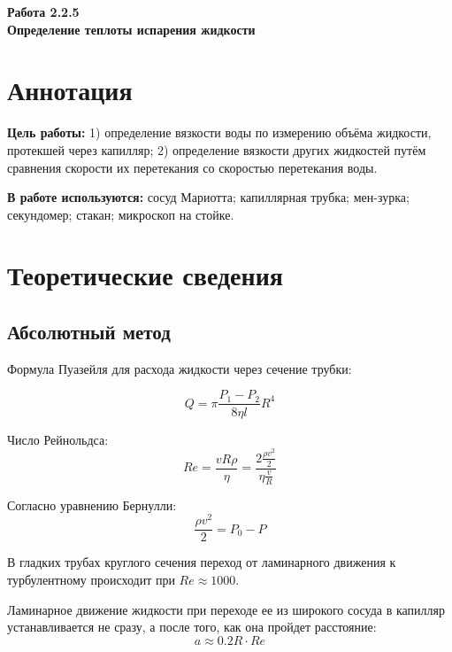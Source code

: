 \documentclass[a4paper,12pt]{article} %
\begin{document}
\begin{center}   
	\large{\textbf{Работа 2.2.5 \\ Определение теплоты испарения жидкости}}\\
\end{center}

\section{Аннотация}

\noindent\textbf{Цель работы:}
1) определение вязкости воды по измерению объёма жидкости, протекшей через капилляр; 2) определение вязкости других жидкостей путём сравнения скорости их перетекания со скоростью перетекания воды.
	
\smallskip
\noindent\textbf{В работе используются:}
сосуд Мариотта; капиллярная трубка; мен-зурка; секундомер; стакан; микроскоп на стойке.

\section{Теоретические сведения}

\subsection*{Абсолютный метод}

Формула Пуазейля для расхода жидкости через сечение трубки:

\begin{equation}
	Q = \pi \frac{P_1-P_2}{8 \eta l} R^4
\end{equation}

Число Рейнольдса:
\begin{equation}
	Re = \frac{v R \rho}{\eta} = \frac{2\frac{\rho v^2}{2}}{\eta \frac{v}{R}}
\end{equation}

Согласно уравнению Бернулли:
\begin{equation}
	\frac{\rho v^2}{2} = P_0 - P
\end{equation}

В гладких трубах круглого сечения переход от ламинарного движения к турбулентному происходит при $Re \approx 1000$.

Ламинарное движение жидкости при переходе ее из широкого сосуда в капилляр устанавливается не сразу, а после того, как она пройдет расстояние:
\begin{equation}
	a \approx 0.2R \cdot Re
\end{equation}
\end{document}

